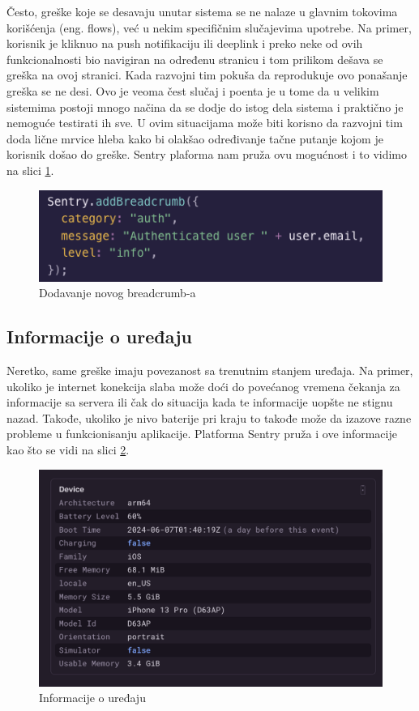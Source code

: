 \documentclass[12pt,oneside]{memoir}
\begin{document}
Često, greške koje se desavaju unutar sistema se ne nalaze u glavnim tokovima korišćenja (eng. flows), već u nekim specifičnim slučajevima upotrebe. Na primer, korisnik je kliknuo na push notifikaciju ili deeplink\cite[133 - 139]{reactNative} i preko neke od ovih funkcionalnosti bio navigiran na određenu stranicu i tom prilikom dešava se greška na ovoj stranici. Kada razvojni tim pokuša da reprodukuje ovo ponašanje greška se ne desi. Ovo je veoma čest slučaj i poenta je u tome da u velikim sistemima postoji mnogo načina da se dodje do istog dela sistema i praktično je nemoguće testirati ih sve. U ovim situacijama može biti korisno da razvojni tim doda lične mrvice hleba kako bi olakšao određivanje tačne putanje kojom je korisnik došao do greške. Sentry plaforma nam pruža ovu mogućnost i to vidimo na slici \ref{fig:addBreadcrumb}.

\begin{figure}[h!]
\centering
\includegraphics[scale=0.8]{docs/images/chapterSeven/addBreadcrumb.png}
\caption{Dodavanje novog breadcrumb-a}
\label{fig:addBreadcrumb}
\end{figure}

\subsection{Informacije o uređaju}

Neretko, same greške imaju povezanost sa trenutnim stanjem uređaja. Na primer, ukoliko je internet konekcija slaba može doći do povećanog vremena čekanja za informacije sa servera ili čak do situacija kada te informacije uopšte ne stignu nazad. Takođe, ukoliko je nivo baterije pri kraju to takođe može da izazove razne probleme u funkcionisanju aplikacije. Platforma Sentry pruža i ove informacije kao što se vidi na slici \ref{fig:deviceInfo}.

\begin{figure}[h!]
\centering
\includegraphics[scale=0.8]{docs/images/chapterSeven/deviceInfo.png}
\caption{Informacije o uređaju}
\label{fig:deviceInfo}
\end{figure}
\end{document}
